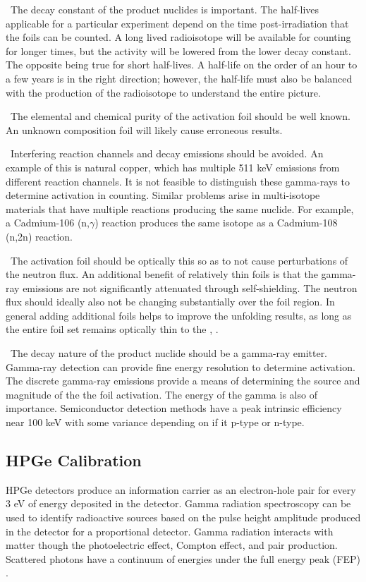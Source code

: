 \documentclass[journal]{IEEEtran}
\begin{document}
	\ The decay constant of the product nuclides is important. The 
	half-lives applicable for a particular experiment depend on the time 
	post-irradiation that the foils can be counted. A long lived radioisotope 
	will be available for counting for longer times, but the activity will be 
	lowered from the lower decay constant. The opposite being true for short 
	half-lives. A half-life on the order of an hour to a few years is in the 
	right direction; however, the half-life must also be balanced with the 
	production of the radioisotope to understand the entire picture. 
	
	\ The elemental and chemical purity of the activation foil should be 
	well known. An unknown composition foil will likely cause erroneous 
	results. 
	
	\ Interfering reaction channels and decay emissions should be avoided. 
	An example of this is natural copper, which has multiple 511 keV emissions 
	from different reaction channels. It is not feasible to distinguish these 
	gamma-rays to determine activation in counting. Similar problems arise in 
	multi-isotope materials that have multiple reactions producing the same 
	nuclide. For example, a Cadmium-106 (n,$\gamma$) reaction produces the same 
	isotope as a Cadmium-108 (n,2n) reaction. 
	
	\ The activation foil should be optically this so as to not cause 
	perturbations of the neutron flux. An additional benefit of relatively thin 
	foils is that the gamma-ray emissions are not significantly attenuated 
	through self-shielding. The neutron flux should ideally also not be 
	changing substantially over the foil region. In general adding additional foils helps to improve the unfolding results, as long as the entire foil set remains optically thin to the , \cite{Vagena2018b}. 
	
	\ The decay nature of the product nuclide should be a gamma-ray 
	emitter. Gamma-ray detection can provide fine energy resolution to 
	determine activation. The discrete gamma-ray emissions provide a means of 
	determining the source and magnitude of the the foil activation. The energy 
	of the gamma is also of importance. Semiconductor detection methods have a 
	peak intrinsic efficiency near 100 keV with some variance depending on if 
	it p-type or n-type. 
	
	\subsection{HPGe Calibration}
	HPGe detectors produce an information carrier as an electron-hole pair for every 3 eV of energy deposited in the detector\cite{Leo}. Gamma radiation spectroscopy can be used to identify radioactive sources based on the pulse height amplitude produced in the detector for a proportional detector. Gamma radiation interacts with matter though the photoelectric effect, Compton effect, and pair production. Scattered photons have a continuum of energies under the full energy peak (FEP) \cite{Knoll}.
	
\end{document}
